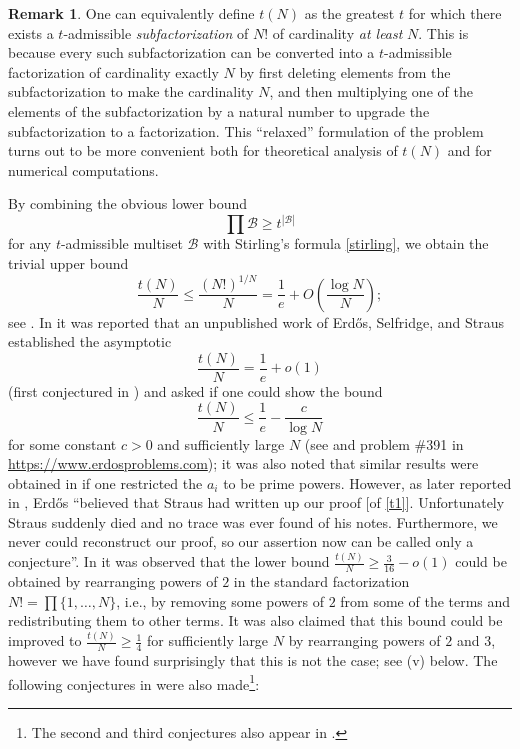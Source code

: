 \documentclass[12pt,a4paper,reqno]{amsart}
\numberwithin{equation}{section}
\theoremstyle{plain}
\theoremstyle{definition}
\newtheorem{remark}[theorem]{Remark}
\newcommand\tuple{{\mathcal B}}
\begin{document}
\begin{remark}\label{subfac}  One can equivalently define $t(N)$ as the greatest $t$ for which there exists a $t$-admissible \emph{subfactorization} of $N!$ of cardinality \emph{at least} $N$.  This is because every such subfactorization can be converted into a $t$-admissible factorization of cardinality exactly $N$ by first deleting elements from the subfactorization to make the cardinality $N$, and then multiplying one of the elements of the subfactorization by a natural number to upgrade the subfactorization to a factorization.  This ``relaxed'' formulation of the problem turns out to be more convenient both for theoretical analysis of $t(N)$ and for numerical computations.
\end{remark}

By combining the obvious lower bound
\begin{equation}\label{obvious}
 \prod \tuple \geq t^{|\tuple|}
\end{equation}
for any $t$-admissible multiset $\tuple$ with Stirling's formula \eqref{stirling}, we obtain the trivial upper bound
\begin{equation}\label{trivial} \frac{t(N)}{N} \leq \frac{(N!)^{1/N}}{N} = \frac{1}{e} + O\left( \frac{\log N}{N}\right);
\end{equation}
see .  In \cite[p.75]{erdos-graham} it was reported that an unpublished work of Erd\H{o}s, Selfridge, and Straus established the asymptotic
\begin{equation}\label{t1}
  \frac{t(N)}{N} = \frac{1}{e} + o(1)
\end{equation}
(first conjectured in \cite{erdos-71}) and asked if one could show the bound
\begin{equation}\label{Tbound}
   \frac{t(N)}{N} \leq \frac{1}{e} - \frac{c}{\log N}
\end{equation}
for some constant $c>0$ and sufficiently large $N$ (see \cite[Section B22, p. 122--123]{guy} and problem {\#}391 in \url{https://www.erdosproblems.com}); it was also noted that similar results were obtained in \cite{algr77} if one restricted the $a_i$ to be prime powers.  However, as later reported in \cite{erdos-96}, Erd\H{o}s ``believed that Straus had written up our proof [of \eqref{t1}]. Unfortunately Straus suddenly died and no trace was ever found of his notes. Furthermore, we never could reconstruct our proof, so our assertion now can be called only a conjecture''.   In \cite{guy-selfridge} it was observed that the lower bound $\frac{t(N)}{N} \geq \frac{3}{16}-o(1)$ could be obtained by rearranging powers of $2$ in the standard factorization $N! = \prod \{1,\dots,N\}$, i.e., by removing some powers of $2$ from some of the terms and redistributing them to other terms.  It was also claimed that this bound could be improved to $\frac{t(N)}{N} \geq \frac{1}{4}$ for sufficiently large $N$ by rearranging powers of $2$ and $3$, however we have found surprisingly that this is not the case; see (v) below.  The following conjectures in \cite{guy-selfridge} were also made\footnote{The second and third conjectures also appear in \cite{guy}.}:
\end{document}

